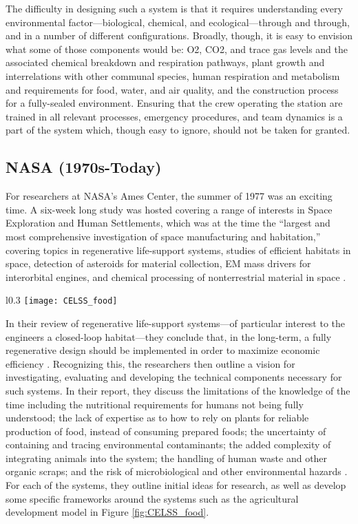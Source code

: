 The difficulty in designing such a system is that it requires understanding every environmental factor—biological, chemical, and ecological—through and through, and in a number of different configurations. Broadly, though, it is easy to envision what some of those components would be: O2, CO2, and trace gas levels and the associated chemical breakdown and respiration pathways, plant growth and interrelations with other communal species, human respiration and metabolism and requirements for food, water, and air quality, and the construction process for a fully-sealed environment. Ensuring that the crew operating the station are trained in all relevant processes, emergency procedures, and team dynamics is a part of the system which, though easy to ignore, should not be taken for granted. 
\subsection{NASA (1970s-Today)}
For researchers at NASA’s Ames Center, the summer of 1977 was an exciting time. A six-week long study was hosted covering a range of interests in Space Exploration and Human Settlements, which was at the time the “largest and most comprehensive investigation of space manufacturing and habitation,” covering topics in regenerative life-support systems, studies of efficient habitats in space, detection of asteroids for material collection, EM mass drivers for interorbital engines, and chemical processing of nonterrestrial material in space \cite{space_settlements}.

\begin{wrapfigure}{l}{0.3\textwidth}
    \centering
    \texttt{[image: CELSS\_food]}
    \caption{CELSS food system design}
    \label{fig:CELSS_food}
\end{wrapfigure}

In their review of regenerative life-support systems—of particular interest to the engineers a closed-loop habitat—they conclude that, in the long-term, a fully regenerative design should be implemented in order to maximize economic efficiency \cite{space_settlements}. Recognizing this, the researchers then outline a vision for investigating, evaluating and developing the technical components necessary for such systems. In their report, they discuss the limitations of the knowledge of the time including the nutritional requirements for humans not being fully understood; the lack of expertise as to how to rely on plants for reliable production of food, instead of consuming prepared foods; the uncertainty of containing and tracing environmental contaminants; the added complexity of integrating animals into the system; the handling of human waste and other organic scraps; and the risk of microbiological and other environmental hazards \cite{space_settlements}. For each of the systems, they outline initial ideas for research, as well as develop some specific frameworks around the systems such as the agricultural development model in Figure \ref{fig:CELSS_food}.


